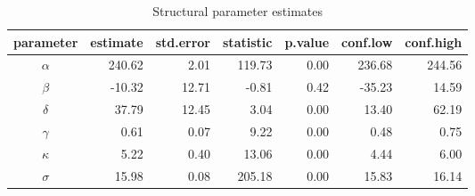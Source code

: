 \begin{table}[!h]

\caption{\label{tab:structural}Structural parameter estimates}
\centering
\begin{tabular}[t]{crrrrrr}
\toprule
parameter & estimate & std.error & statistic & p.value & conf.low & conf.high\\
\midrule
$\alpha$ & 240.62 & 2.01 & 119.73 & 0.00 & 236.68 & 244.56\\
$\beta$ & -10.32 & 12.71 & -0.81 & 0.42 & -35.23 & 14.59\\
$\delta$ & 37.79 & 12.45 & 3.04 & 0.00 & 13.40 & 62.19\\
$\gamma$ & 0.61 & 0.07 & 9.22 & 0.00 & 0.48 & 0.75\\
$\kappa$ & 5.22 & 0.40 & 13.06 & 0.00 & 4.44 & 6.00\\
\addlinespace
$\sigma$ & 15.98 & 0.08 & 205.18 & 0.00 & 15.83 & 16.14\\
\bottomrule
\end{tabular}
\end{table}
